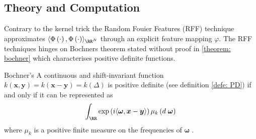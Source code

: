 \subsection{Theory and Computation}\label{Section3.1}
Contrary to the kernel trick the Random Fouier Features (RFF) technique approximates $\langle \Phi \left( \cdot \right) , \Phi \left( \cdot \right) \rangle_{\RR^N}$ through an explicit feature mapping $\varphi$. The RFF techniques hinges on Bochners theorem stated without proof in \ref{theorem: bochner} which characterises positive definite functions.

\begin{thm}{Bochner's} \label{theorem: bochner}
    A continuous and shift-invariant function $k \left( \bm{x} , \bm{y} \right) = k \left( \bm{x} - \bm{y} \right) = k \left( \Delta \right)$ is positive definite (see definition \ref{defe: PD}) if and only if it can be represented as
    \[
        \int_{\RR} \exp \left( i \langle \bm{\omega} , \bm{x} - \bm{y} \rangle \right) \mu_k \left( d \; \bm{\omega} \right)
    \]
    where $\mu_k$ is a positive finite measure on the frequencies of $\bm{\omega}$ \cite{HahnHans1933SBVü,LiuFanghui2021RFfK}.
\end{thm}